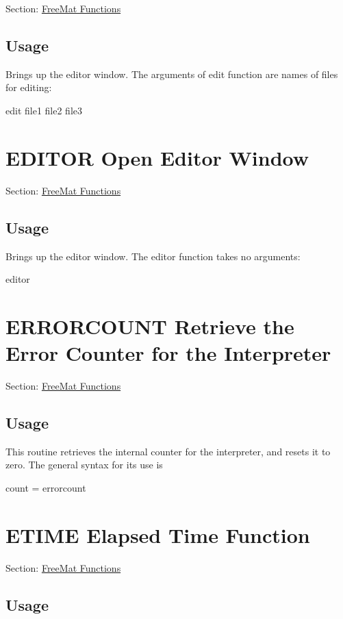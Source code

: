 Section\-: \hyperlink{sec_freemat}{Free\-Mat Functions} \hypertarget{vtkwidgets_vtkxyplotwidget_Usage}{}\subsection{Usage}\label{vtkwidgets_vtkxyplotwidget_Usage}
Brings up the editor window. The arguments of {\ttfamily edit} function are names of files for editing\-: \begin{DoxyVerb}  edit file1 file2 file3
\end{DoxyVerb}
 \hypertarget{freemat_editor}{}\section{E\-D\-I\-T\-O\-R Open Editor Window}\label{freemat_editor}
Section\-: \hyperlink{sec_freemat}{Free\-Mat Functions} \hypertarget{vtkwidgets_vtkxyplotwidget_Usage}{}\subsection{Usage}\label{vtkwidgets_vtkxyplotwidget_Usage}
Brings up the editor window. The {\ttfamily editor} function takes no arguments\-: \begin{DoxyVerb}  editor
\end{DoxyVerb}
 \hypertarget{freemat_errorcount}{}\section{E\-R\-R\-O\-R\-C\-O\-U\-N\-T Retrieve the Error Counter for the Interpreter}\label{freemat_errorcount}
Section\-: \hyperlink{sec_freemat}{Free\-Mat Functions} \hypertarget{vtkwidgets_vtkxyplotwidget_Usage}{}\subsection{Usage}\label{vtkwidgets_vtkxyplotwidget_Usage}
This routine retrieves the internal counter for the interpreter, and resets it to zero. The general syntax for its use is \begin{DoxyVerb}   count = errorcount
\end{DoxyVerb}
 \hypertarget{freemat_etime}{}\section{E\-T\-I\-M\-E Elapsed Time Function}\label{freemat_etime}
Section\-: \hyperlink{sec_freemat}{Free\-Mat Functions} \hypertarget{vtkwidgets_vtkxyplotwidget_Usage}{}\subsection{Usage}\label{vtkwidgets_vtkxyplotwidget_Usage}
